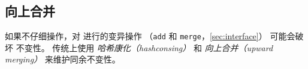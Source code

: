 




\subsection{向上合并}
\label{sec:upward}

如果不仔细操作，对 \egraph 进行的变异操作 （\texttt{add} 和 \texttt{merge}，\autoref{sec:interface}）
  可能会破坏 \egraph 不变性。
\Egraphs 传统上使用 \textit{哈希康化（hashconsing）} 和  %
  \textit{向上合并（upward merging）} 来维护同余不变性。


